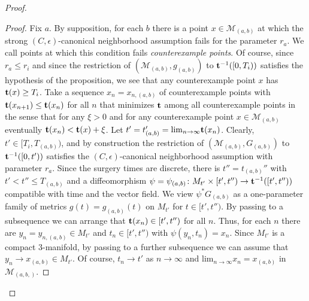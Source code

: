 \begin{proof}
\begin{proof}
Fix $a$.
 By supposition, for each $b$ there is a point $x\in {\mathcal M}_{(a,b)}$ at
which the strong $(C,\epsilon)$-canonical neighborhood assumption
fails for the parameter $r_a$. We call points at which this
condition fails {\em counterexample points}. Of course, since
$r_a\le r_i$ and since the restriction of $({\mathcal
M}_{(a,b)},g_{(a,b)})$ to ${\bf t}^{-1}([0,T_i))$ satisfies the
hypothesis of the proposition, we see that any counterexample point
$x$ has ${\bf t}(x)\ge T_i$. Take a sequence $x_n=x_{n,(a,b)}$   of
counterexample points with ${\bf t}(x_{n+1})\le {\bf t}(x_{n})$ for
all $n$ that minimizes ${\bf t}$ among all counterexample points in
the sense that for any $\xi>0$ and for any counterexample point
$x\in {\mathcal M}_{(a,b)}$ eventually ${\bf t}(x_{n})< {\bf
t}(x)+\xi$. Let $t'=t_{(a,b)}'=\mathrm{lim}_{n\rightarrow\infty}{\bf
t}(x_{n})$. Clearly, $t'\in [T_i,T_{(a,b)})$, and by construction
the restriction of $({\mathcal M}_{(a,b)},G_{(a,b)})$ to ${\bf
t}^{-1}([0,t'))$ satisfies the $(C,\epsilon)$-canonical neighborhood assumption
with parameter $r_a$. Since the surgery times are discrete, there is
$t''=t_{(a,b)}''$ with $t'<t''\le T_{(a,b)}$ and a diffeomorphism
$\psi=\psi_{(a,b)}\colon M_{ t'}\times[t',t'')\to {\bf
t}^{-1}([t',t''))$ compatible with time and the vector field. We
view $\psi^*G_{(a,b)}$ as a one-parameter family of metrics
$g(t)=g_{(a,b)}(t)$ on $M_{t'}$ for $t\in [t',t'')$. By passing to a
subsequence we can arrange that ${\bf t}(x_{n})\in [t',t'')$ for all
$n$. Thus, for each $n$ there are $y_n=y_{n,(a,b)}\in M_{t'}$ and
$t_{n}\in [t',t'')$ with $\psi(y_{n},t_{n})=x_{n}$. Since
$M_{t'}$ is a compact $3$-manifold, by passing to a further
subsequence we can assume that $y_{n}\rightarrow x_{(a,b)}\in
M_{t'}$. Of course, $t_{n}\rightarrow t'$ as $n\rightarrow\infty$ and
 $\mathrm{lim}_{n\rightarrow
\infty}x_{n}=x_{(a,b)}$ in ${\mathcal M}_{(a,b,)}$.


\end{proof}
\end{proof}
